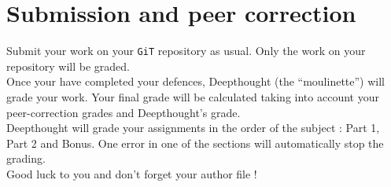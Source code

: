 \documentclass{42-en}
\begin{document}
\chapter{Submission and peer correction}

    Submit your work on your \texttt{GiT} repository as usual.
    Only the work on your repository will be graded.\\

    Once your have completed your defences, Deepthought (the
    ``moulinette'') will grade your work. Your final grade will be
    calculated taking into account your peer-correction grades and
    Deepthought’s grade.\\

    Deepthought will grade your assignments in the order of the
    subject : Part 1, Part 2 and Bonus. One error in one of the
    sections will automatically stop the grading.\\

    Good luck to you and don’t forget your author file !
\end{document}
